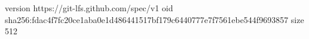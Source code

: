 version https://git-lfs.github.com/spec/v1
oid sha256:fdac4f7fc20ce1aba0e1d486441517bf179c6440777e7f7561ebe544f9693857
size 512
